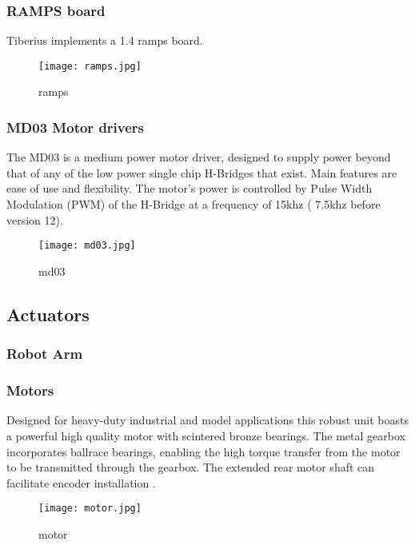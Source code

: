 \subsubsection{RAMPS board}
Tiberius implements a 1.4 ramps board.
\begin{figure}[!htb]
\begin{center}
\texttt{[image: ramps.jpg]}
\end{center}
\caption{ramps}
\label{fig:ramps}
\end{figure}

\subsubsection{MD03 Motor drivers}
The MD03 is a medium power motor driver, designed to supply power beyond that of any of the low power single chip H-Bridges that exist. Main features are ease of use and flexibility. The motor's power is controlled by Pulse Width Modulation (PWM) of the H-Bridge at a frequency of 15khz ( 7.5khz before version 12). 
\begin{figure}[!htb]
\begin{center}
\texttt{[image: md03.jpg]}
\end{center}
\caption{md03}
\label{fig:md03}
\end{figure}



\subsection{Actuators}
\subsubsection{Robot Arm}
\subsubsection{Motors}
Designed for heavy-duty industrial and model applications this robust unit boasts a powerful high quality motor with scintered bronze bearings. The metal gearbox incorporates ballrace bearings, enabling the high torque transfer from the motor to be
transmitted through the gearbox. The extended rear motor shaft can facilitate encoder installation \cite{Dun_dcmotor}.
\begin{figure}[!htb]
\begin{center}
\texttt{[image: motor.jpg]}
\end{center}
\caption{motor}
\label{fig:motor}
\end{figure}


